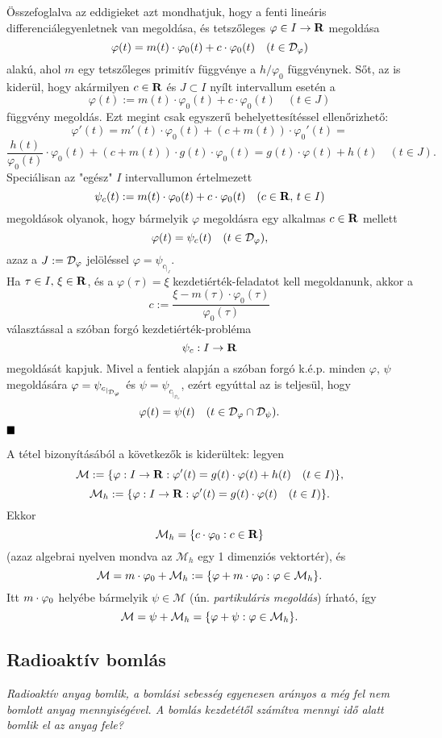 Összefoglalva az eddigieket azt mondhatjuk, hogy a fenti lineáris differenciálegyenletnek van megoldása, és tetszőleges $\varphi \in I \to \mathbf{R}$ megoldása
\[
\varphi(t) = m(t) \cdot \varphi_0(t) + c \cdot \varphi_0(t) \quad (t \in \mathcal{D}_\varphi)
\]
alakú, ahol $m$ egy tetszőleges primitív függvénye a $h / \varphi_0$ függvénynek. Sőt, az is kiderül, hogy akármilyen $c \in \mathbf{R}$ és $J \subset I$ nyílt intervallum esetén a
\[
\varphi(t) := m(t) \cdot \varphi_0(t) + c \cdot \varphi_0(t) \quad (t \in J)
\]
függvény megoldás. Ezt megint csak egyszerű behelyettesítéssel ellenőrizhető:
\[
\varphi'(t) = m'(t) \cdot \varphi_0(t) + (c + m(t)) \cdot \varphi_0'(t) =
\]
\[
\frac{h(t)}{\varphi_0(t)} \cdot \varphi_0(t) + (c + m(t)) \cdot g(t) \cdot \varphi_0(t) = g(t) \cdot \varphi(t) + h(t) \quad (t \in J).
\]
Speciálisan az "egész" $I$ intervallumon értelmezett
\[
\psi_c(t) := m(t) \cdot \varphi_0(t) + c \cdot \varphi_0(t) \quad (c \in \mathbf{R}, \, t \in I)
\]
megoldások olyanok, hogy bármelyik $\varphi$ megoldásra egy alkalmas $c \in \mathbf{R}$ mellett
\[
\varphi(t) = \psi_c(t) \quad (t \in \mathcal{D}_\varphi),
\]
azaz a $J := \mathcal{D}_\varphi$ jelöléssel $\varphi = \psi_{c_{|_J}}$.\\

Ha $\tau \in I, \, \xi \in \mathbf{R}$, és a $\varphi(\tau) = \xi$ kezdetiérték-feladatot kell megoldanunk, akkor a
\[
c := \frac{\xi - m(\tau) \cdot \varphi_0(\tau)}{\varphi_0(\tau)}
\]
választással a szóban forgó kezdetiérték-probléma
\[
\psi_c : I \to \mathbf{R}
\]
megoldását kapjuk. Mivel a fentiek alapján a szóban forgó k.é.p. minden $\varphi, \, \psi$ megoldására $\varphi = \psi_{c_{|_{\mathcal{D}_\varphi}}}$ és $\psi = \psi_{c_{|_{\mathcal{D}_\psi}}}$, ezért egyúttal az is teljesül, hogy
\[
\varphi(t) = \psi(t) \quad (t \in \mathcal{D}_\varphi \cap \mathcal{D}_\psi).
\]
$\hfill \blacksquare$

A tétel bizonyításából a következők is kiderültek: legyen
\[
	\mathcal{M} := \{ \varphi : I \to \mathbf{R} : \varphi'(t) = g(t) \cdot \varphi(t) + h(t) \quad (t \in I) \},
\]
\[
	\mathcal{M}_h := \{ \varphi : I \to \mathbf{R} : \varphi'(t) = g(t) \cdot \varphi(t) \quad (t \in I) \}.
\]
Ekkor
\[
	\mathcal{M}_h = \{ c \cdot \varphi_0 : c \in \mathbf{R} \}
\]
(azaz algebrai nyelven mondva az $\mathcal{M}_h$ egy 1 dimenziós vektortér), és
\[
	\mathcal{M} = m \cdot \varphi_0 + \mathcal{M}_h := \{ \varphi + m \cdot \varphi_0 : \varphi \in \mathcal{M}_h \}.
\]
Itt $m \cdot \varphi_0$ helyébe bármelyik $\psi \in \mathcal{M}$ (ún. \textit{partikuláris megoldás}) írható, így
\[
	\mathcal{M} = \psi + \mathcal{M}_h = \{ \varphi + \psi : \varphi \in \mathcal{M}_h \}.
\]

\subsection{Radioaktív bomlás}
\textit{Radioaktív anyag bomlik, a bomlási sebesség egyenesen arányos a még fel nem bomlott anyag mennyiségével. A bomlás kezdetétől számítva mennyi idő alatt bomlik el az anyag fele?}\\

